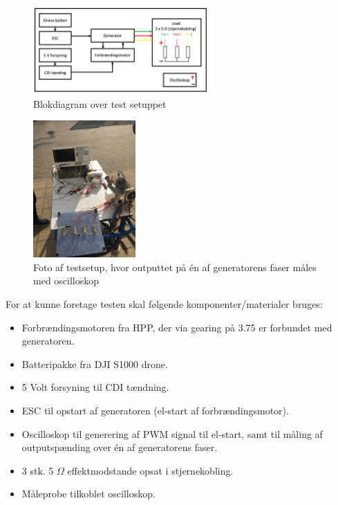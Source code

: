\begin{figure}[h]
  \centering
  \includegraphics[width=0.6\textwidth]{blokdia.png}
  \caption{Blokdiagram over test setuppet}
  \label{fig:testsetup2}
\end{figure}


\begin{figure}[h]
  \centering
  \includegraphics[angle=-90,width=0.35\textwidth]{testsetup.JPG}
  \caption{Foto af testsetup, hvor outputtet på én af generatorens faser måles med oscilloskop}
  \label{fig:testsetup}
\end{figure}


For at kunne foretage testen skal følgende komponenter/materialer bruges:
\begin{itemize}
\item Forbrændingsmotoren fra HPP, der via gearing på 3.75 er forbundet med generatoren.
\item Batteripakke fra DJI S1000 drone.
\item 5 Volt forsyning til CDI tændning.
\item ESC til opstart af generatoren (el-start af forbrændingsmotor).
\item Oscilloskop til generering af PWM signal til el-start, samt til måling af outputspænding over én af generatorens faser.
\item 3 stk. 5 $\Omega$ effektmodstande opsat i stjernekobling.
\item Måleprobe tilkoblet oscilloskop.
\end{itemize}

